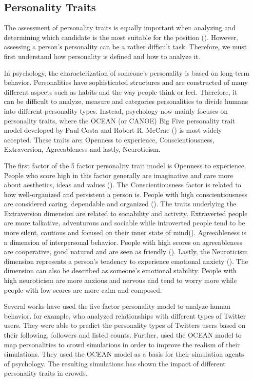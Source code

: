 \subsection{Personality Traits}
The assessment of personality traits is equally important when analyzing and determining which candidate is the most suitable for the position (\cite{kinsman2005hiring}). However, assessing a person's personality can be a rather difficult task. Therefore, we must first understand how personality is defined and how to analyze it. 

In psychology, the characterization of someone's personality is based on long-term behavior. Personalities have sophisticated structures and are constructed of many different aspects such as habits and the way people think or feel. Therefore, it can be difficult to analyze, measure and categories personalities to divide humans into different personality types. Instead, psychology now mainly focuses on personality traits, where the OCEAN (or CANOE) Big Five personality trait model developed by Paul Costa and Robert R. McCrae (\cite{costa1992neo}) is most widely accepted. These traits are; Openness to experience, Conscientiousness, Extraversion, Agreeableness and lastly, Neuroticism. 

The first factor of the 5 factor personality trait model is Openness to experience. People who score high in this factor generally are imaginative and care more about aesthetics, ideas and values (\cite{mccrae1993openness}). The Conscientiousness factor is related to how well-organized and persistent a person is. People with high conscientiousness are considered caring, dependable and organized (\cite{widiger2017oxford}). The traits underlying the Extraversion dimension are related to sociability and activity. Extraverted people are more talkative, adventurous and sociable while introverted people tend to be more silent, cautious and focused on their inner state of mind(\cite{widiger2017oxford}). Agreeableness is a dimension of interpersonal behavior. People with high scores on agreeableness are cooperative, good natured and are seen as friendly (\cite{graziano1997agreeableness}). Lastly, the Neuroticism dimension represents a person's tendency to experience emotional anxiety (\cite{widiger2017oxford}). The dimension can also be described as someone's emotional stability. People with high neuroticism are more anxious and nervous and tend to worry more while people with low scores are more calm and composed. 

Several works have used the five factor personality model to analyze human behavior. \textcite{quercia2011our} for example, who analyzed relationships with different types of Twitter users. They were able to predict the personality types of Twitters users based on their following, followers and listed counts.  Further, \textcite{allbeck2008creating} used the OCEAN model to map personalities to crowd simulations in order to improve the realism of their simulations. They used the OCEAN model as a basis for their simulation agents of psychology. The resulting simulations has shown the impact of different personality traits in crowds. 

